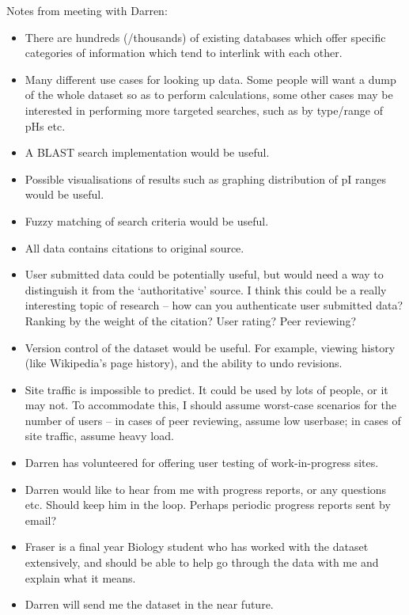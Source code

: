 \noindent
Notes from meeting with Darren:
\begin{itemize}
\item There are hundreds (/thousands) of existing databases which offer specific
  categories of information which tend to interlink with each other.
\item Many different use cases for looking up data. Some people will want a dump
  of the whole dataset so as to perform calculations, some other cases may be
  interested in performing more targeted searches, such as by type/range of pHs
  etc.
\item A BLAST search implementation would be useful.
\item Possible visualisations of results such as graphing distribution of pI
  ranges would be useful.
\item Fuzzy matching of search criteria would be useful.
\item All data contains citations to original source.
\item User submitted data could be potentially useful, but would need a way to
  distinguish it from the `authoritative' source. I think this could be a really
  interesting topic of research – how can you authenticate user submitted data?
  Ranking by the weight of the citation? User rating? Peer reviewing?
\item Version control of the dataset would be useful. For example, viewing
  history (like Wikipedia's page history), and the ability to undo revisions.
\item Site traffic is impossible to predict. It could be used by lots of people,
  or it may not. To accommodate this, I should assume worst-case scenarios for
  the number of users – in cases of peer reviewing, assume low userbase; in
  cases of site traffic, assume heavy load.
\item Darren has volunteered for offering user testing of work-in-progress
  sites.
\item Darren would like to hear from me with progress reports, or any questions
  etc. Should keep him in the loop. Perhaps periodic progress reports sent by
  email?
\item Fraser is a final year Biology student who has worked with the dataset
  extensively, and should be able to help go through the data with me and
  explain what it means.
\item Darren will send me the dataset in the near future.
\end{itemize}

